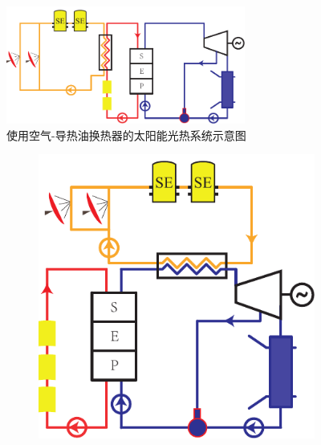 \begin{figure}[ht]
\centering 
\includegraphics[width=0.7\textwidth]{fig/air-oil}
\caption{使用空气-导热油换热器的太阳能光热系统示意图}\label{fig:air-oil}
\end{figure}

\begin{figure}[htbp]
\centering
	\begin{subfigure}[b]{0.4\columnwidth}
	\includegraphics[width = \columnwidth]{fig/air-water1}
	\caption{}\label{fig:air-water_1}
	\end{subfigure}
	~
\begin{subfigure}[b]{0.4\columnwidth}

\end{subfigure}
\end{figure}
